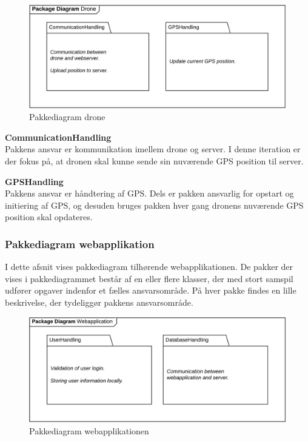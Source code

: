 \begin{figure}[H]
	\centering
	\includegraphics[width=1\textwidth]{Billeder/pakke_diagrammer/iteration1_drone.png}
	\vspace{-0.5cm}
	\caption{Pakkediagram drone}
	\label{fig:iteration1_pakke_diagram_drone}
\end{figure}

\textbf{CommunicationHandling}\\
Pakkens ansvar er kommunikation imellem drone og server. I denne iteration er der fokus på, at dronen skal kunne sende sin nuværende GPS position til server.

\textbf{GPSHandling}\\
Pakkens ansvar er håndtering af GPS. Dels er pakken ansvarlig for opstart og initiering af GPS, og desuden bruges pakken hver gang dronens nuværende GPS position skal opdateres.

\newpage
\subsubsection*{Pakkediagram webapplikation}

I dette afsnit vises pakkediagram tilhørende webapplikationen. De pakker der vises i pakkediagrammet består af en eller flere klasser, der med stort samspil udfører opgaver indenfor et fælles ansvarsområde. På hver pakke findes en lille beskrivelse, der tydeliggør pakkens ansvarsområde. 

\begin{figure}[H]
	\centering
	\includegraphics[width=1\textwidth]{Billeder/pakke_diagrammer/iteration1_server.png}
	\vspace{-0.5cm}
	\caption{Pakkediagram webapplikationen}
	\label{fig:iteration1_pakke_diagram_webapp}
\end{figure}

